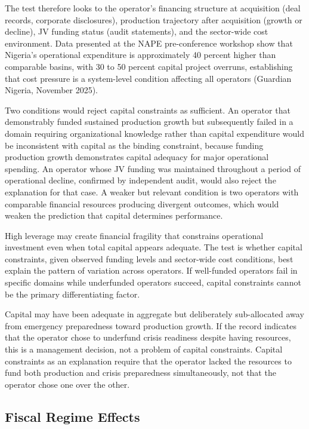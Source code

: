The test therefore looks to the operator's financing structure at
acquisition (deal records, corporate disclosures), production trajectory
after acquisition (growth or decline), JV funding status (audit
statements), and the sector-wide cost environment. Data presented at the
NAPE pre-conference workshop show that Nigeria's operational expenditure
is approximately 40 percent higher than comparable basins, with 30 to 50
percent capital project overruns, establishing that cost pressure is a
system-level condition affecting all operators (Guardian Nigeria,
November 2025).

Two conditions would reject capital constraints as sufficient. An
operator that demonstrably funded sustained production growth but
subsequently failed in a domain requiring organizational knowledge
rather than capital expenditure would be inconsistent with capital as
the binding constraint, because funding production growth demonstrates
capital adequacy for major operational spending. An operator whose JV
funding was maintained throughout a period of operational decline,
confirmed by independent audit, would also reject the explanation for
that case. A weaker but relevant condition is two operators with
comparable financial resources producing divergent outcomes, which would
weaken the prediction that capital determines performance.

High leverage may create financial fragility that constrains operational
investment even when total capital appears adequate. The test is whether
capital constraints, given observed funding levels and sector-wide cost
conditions, best explain the pattern of variation across operators. If
well-funded operators fail in specific domains while underfunded
operators succeed, capital constraints cannot be the primary
differentiating factor.

Capital may have been adequate in aggregate but deliberately
sub-allocated away from emergency preparedness toward production growth.
If the record indicates that the operator chose to underfund crisis
readiness despite having resources, this is a management decision, not a
problem of capital constraints. Capital constraints as an explanation
require that the operator lacked the resources to fund both production
and crisis preparedness simultaneously, not that the operator chose one
over the other.

\hypertarget{fiscal-regime-effects}{%
\subsection{Fiscal Regime Effects}\label{fiscal-regime-effects}}


